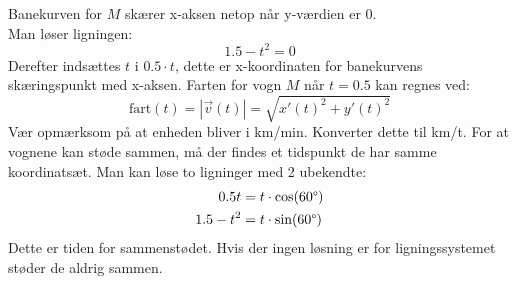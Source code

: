 \documentclass[../main.tex]{subfiles}
\begin{document}
\begin{tcolorbox}[title=Opgave 2,
    colback=blue!1!white,
    colframe=black,
    colbacktitle=blue!25!white,
    coltitle=red!25!black,
    fonttitle=\bfseries,
    subtitle style={boxrule=0.4pt,
    colback=blue!7!white} ]
        Banekurven for \(M\) skærer x-aksen netop når y-værdien er 0.\\
        Man løser ligningen: 
        \[1.5-t^2=0\]
        Derefter indsættes \(t\) i \(0.5 \cdot t\), dette er x-koordinaten for banekurvens skæringspunkt med x-aksen.
        Farten for vogn \(M\) når \(t = 0.5\) kan regnes ved:
        \[\text{fart}(t)=\left| \overrightarrow{v}(t)\right|= \sqrt{x'(t)^2+y'(t)^2}\]
        Vær opmærksom på at enheden bliver i km/min. Konverter dette til km/t.
        For at vognene kan støde sammen, må der findes et tidspunkt de har samme koordinatsæt.
        Man kan løse to ligninger med 2 ubekendte:
        \begin{align}
            0.5t&=t\cdot \text{cos}(60\degree)\\
            1.5-t^2&=t\cdot \text{sin}(60\degree)
        \end{align}
        Dette er tiden for sammenstødet. Hvis der ingen løsning er for ligningssystemet støder de aldrig sammen.
\end{tcolorbox}
\vspace*{2 cm}
\end{document}
